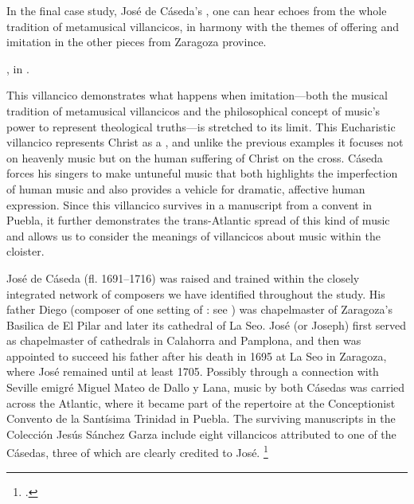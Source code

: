 In the final case study, José de Cáseda's , one can
hear echoes from the whole tradition of metamusical villancicos, in harmony
with the themes of offering and imitation in the other pieces from Zaragoza
province.%
\begin{Footnote} 
    , in \autocite[41--42, 153--192]{Cashner:WLSCM32}.
\end{Footnote}
This villancico demonstrates what happens when imitation---both the musical
tradition of metamusical villancicos and the philosophical concept of music's
power to represent theological truths---is stretched to its limit.
This Eucharistic villancico represents Christ as a , and unlike
the previous examples it focuses not on heavenly music but on the human
suffering of Christ on the cross.
Cáseda forces his singers to make untuneful music that both highlights the
imperfection of human music and also provides a vehicle for dramatic, affective
human expression. 
Since this villancico survives in a manuscript from a convent in Puebla, it
further demonstrates the trans-Atlantic spread of this kind of music and allows
us to consider the meanings of villancicos about music within the cloister.

José de Cáseda (fl. 1691--1716) was raised and trained within the closely
integrated network of composers we have identified throughout the study.%
    \Autocites
    [120--121]{Calahorra:Zaragoza2}
    {Stevenson:CasedaD}
His father Diego (composer of one setting of : see
) was chapelmaster of Zaragoza's Basilica de El
Pilar and later its cathedral of La Seo.
José (or Joseph) first served as chapelmaster of cathedrals in Calahorra and
Pamplona, and then was appointed to succeed his father after his death in 1695
at La Seo in Zaragoza, where José remained until at least 1705.
Possibly through a connection with Seville emigré Miguel Mateo de Dallo y Lana,
music by both Cásedas was carried across the Atlantic, where it became part of
the repertoire at the Conceptionist Convento de la Santísima Trinidad in
Puebla.
The surviving manuscripts in the Colección Jesús Sánchez Garza include eight
villancicos attributed to one of the Cásedas, three of which are clearly
credited to José.%
    \footnote{.}

